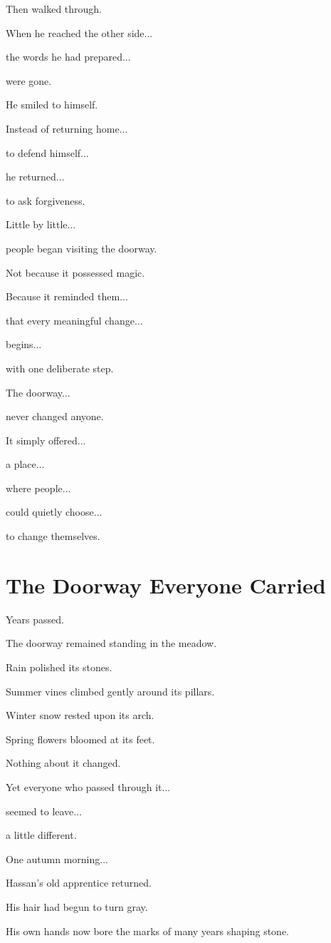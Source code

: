 \documentclass[12pt,openany]{book}
\begin{document}
Then walked through.

When he reached the other side...

the words he had prepared...

were gone.

He smiled to himself.

Instead of returning home...

to defend himself...

he returned...

to ask forgiveness.

Little by little...

people began visiting the doorway.

Not because it possessed magic.

Because it reminded them...

that every meaningful change...

begins...

with one deliberate step.

The doorway...

never changed anyone.

It simply offered...

a place...

where people...

could quietly choose...

to change themselves.
\section*{The Doorway Everyone Carried}

Years passed.

The doorway remained standing in the meadow.

Rain polished its stones.

Summer vines climbed gently around its pillars.

Winter snow rested upon its arch.

Spring flowers bloomed at its feet.

Nothing about it changed.

Yet everyone who passed through it...

seemed to leave...

a little different.

One autumn morning...

Hassan's old apprentice returned.

His hair had begun to turn gray.

His own hands now bore the marks of many years shaping stone.
\end{document}
